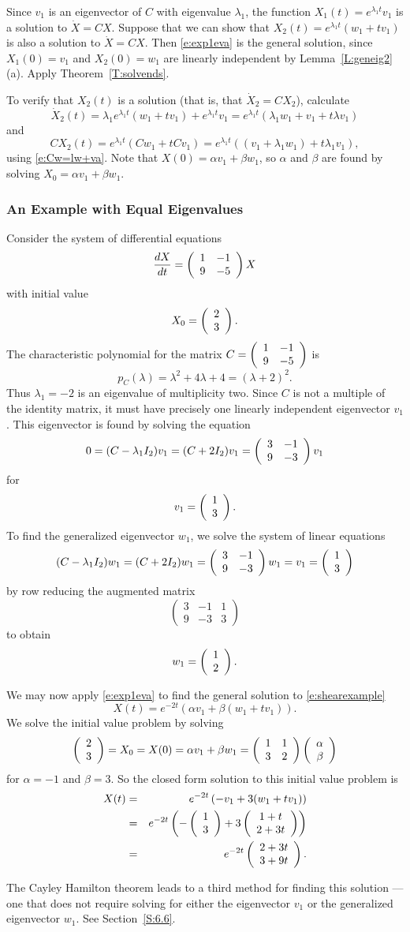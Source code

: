 \documentclass{ximera}
\begin{document}
Since $v_1$ is an eigenvector of $C$ with eigenvalue $\lambda_1$, the
function $X_1(t)=e^{\lambda_1 t}v_1$ is a solution to $\dot{X}=CX$.  Suppose
that we can show that $X_2(t)=e^{\lambda_1 t}(w_1+tv_1)$ is also a solution
to $\dot{X}=CX$.  Then \eqref{e:exp1eva} is the general solution, since
$X_1(0)=v_1$ and $X_2(0)=w_1$ are linearly independent by 
Lemma~\ref{L:geneig2}(a).  Apply Theorem~\ref{T:solvends}.

To verify that $X_2(t)$ is a solution (that is, that $\dot{X}_2=CX_2$),
calculate
\[
\dot{X}_2(t) = \lambda_1 e^{\lambda_1 t}(w_1+tv_1) + e^{\lambda_1 t}v_1=
e^{\lambda_1 t}(\lambda_1 w_1 + v_1 +t\lambda v_1)
\]
and
\[
CX_2(t) = e^{\lambda_1 t}(Cw_1+tCv_1) = e^{\lambda_1 t}
((v_1+\lambda_1 w_1)+t\lambda_1 v_1),
\]
using \eqref{e:Cw=lw+va}.  Note that $X(0)=\alpha v_1 + \beta w_1$, so $\alpha$
and $\beta$ are found by solving $X_0= \alpha v_1 + \beta w_1$.

\subsubsection*{An Example with Equal Eigenvalues}

Consider the system of differential equations
\begin{equation}  \label{e:shearexample}
\frac{dX}{dt} = \left(\begin{array}{rr} 1 & -1\\ 9 &-5\end{array}\right) X
\end{equation}
with initial value
\[
X_0 = \left(\begin{array}{r} 2 \\ 3\end{array}\right).
\]
The characteristic polynomial for the matrix $C=\left(\begin{array}{rr} 1 & -1\\ 9 &-5\end{array}\right)$ is
\[
p_C(\lambda) = \lambda^2 + 4\lambda +4 = (\lambda + 2)^2.
\]
Thus $\lambda_1=-2$ is an eigenvalue of multiplicity two.  Since
$C$ is not a multiple of the identity matrix, it must have
precisely one linearly independent eigenvector $v_1$.  This eigenvector is
found by solving the equation
\[
0 = (C-\lambda_1I_2)v_1 = (C+2I_2)v_1 = \left(\begin{array}{rr} 3 & -1\\ 9 &-3\end{array}\right)v_1
\]
for
\[
v_1=\left(\begin{array}{r} 1 \\ 3\end{array}\right).
\]
To find the generalized eigenvector $w_1$, we solve the system of linear
equations
\[
(C-\lambda_1I_2)w_1=(C+2I_2)w_1=\left(\begin{array}{rr} 3 & -1\\ 9 &-3\end{array}\right)w_1= v_1=\left(\begin{array}{r} 1 \\ 3\end{array}\right)
\]
by row reducing the augmented matrix
\[
\left(\begin{array}{rr|r} 3 & -1 & 1\\ 9 & -3 & 3 \end{array}\right)
\]
to obtain
\[
w_1 = \left(\begin{array}{r} 1 \\ 2\end{array}\right).
\]

We may now apply \eqref{e:exp1eva} to find the general solution to
\eqref{e:shearexample}
\[
X(t) = e^{-2t}\left(\alpha v_1 +\beta (w_1+tv_1)\right).
\]
We solve the initial value problem by solving
\[
\left(\begin{array}{r} 2 \\ 3\end{array}\right) = X_0 = X(0) = \alpha v_1 +\beta w_1 =
\left(\begin{array}{rr} 1 & 1\\ 3 &2\end{array}\right)\left(\begin{array}{r} \alpha \\ \beta\end{array}\right)
\]
for $\alpha=-1$ and $\beta=3$.   So the closed form solution to this initial
value problem is
\begin{eqnarray*}
X(t) & = & e^{-2t}\left(-v_1 + 3(w_1+tv_1)\right)\\
& = & e^{-2t}\left(-\left(\begin{array}{r} 1 \\ 3\end{array}\right)+3\left(\begin{array}{c} 1+t \\ 2+3t\end{array}\right)\right)\\
& = & e^{-2t}\left(\begin{array}{r} 2+3t \\ 3+9t\end{array}\right).
\end{eqnarray*}

The Cayley Hamilton theorem leads to a third method for finding this solution 
--- one that does not require solving for either the eigenvector $v_1$ or the 
generalized eigenvector $w_1$.  See Section~\ref{S:6.6}.



\end{document}
